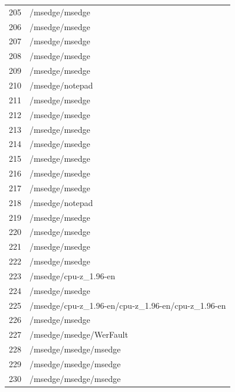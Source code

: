 \documentclass[a4paper,twoside,12pt]{book}
\begin{document}
\begin{appendices}
\begin{table}
\begin{tabular}{ll}
		205 &                                     /msedge/msedge \\
		206 &                                     /msedge/msedge \\
		207 &                                     /msedge/msedge \\
		208 &                                     /msedge/msedge \\
		209 &                                     /msedge/msedge \\
		210 &                                    /msedge/notepad \\
		211 &                                     /msedge/msedge \\
		212 &                                     /msedge/msedge \\
		213 &                                     /msedge/msedge \\
		214 &                                     /msedge/msedge \\
		215 &                                     /msedge/msedge \\
		216 &                                     /msedge/msedge \\
		217 &                                     /msedge/msedge \\
		218 &                                    /msedge/notepad \\
		219 &                                     /msedge/msedge \\
		220 &                                     /msedge/msedge \\
		221 &                                     /msedge/msedge \\
		222 &                                     /msedge/msedge \\
		223 &                              /msedge/cpu-z\_1.96-en \\
		224 &                                     /msedge/msedge \\
		225 &  /msedge/cpu-z\_1.96-en/cpu-z\_1.96-en/cpu-z\_1.96-en \\
		226 &                                     /msedge/msedge \\
		227 &                            /msedge/msedge/WerFault \\
		228 &                              /msedge/msedge/msedge \\
		229 &                              /msedge/msedge/msedge \\
		230 &                              /msedge/msedge/msedge \\
		\bottomrule
	\end{tabular}
\end{table}


\end{appendices}
\end{document}

